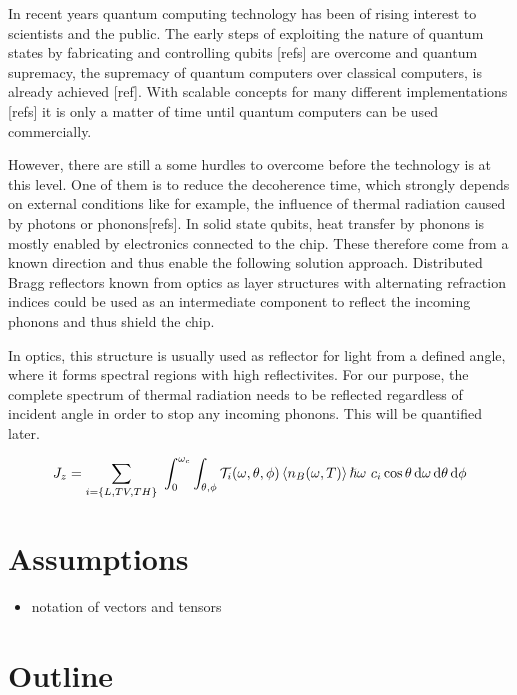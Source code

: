 In recent years quantum computing technology has been of rising
interest to scientists and the public. The early steps of exploiting the nature
of quantum states by fabricating and controlling qubits [refs] are
overcome and quantum supremacy, the supremacy of quantum computers over
classical computers, is already achieved [ref]. With scalable concepts for many
different implementations [refs] it is only a matter of time until quantum
computers can be used commercially.

However, there are still a some hurdles to overcome before the technology is at
this level. One of them is to reduce the decoherence time, which strongly
depends on external conditions like for example, the influence of thermal
radiation caused by photons or phonons[refs]. In solid state qubits, heat
transfer by
phonons is mostly enabled by electronics connected to the chip. These therefore
come from a known direction and thus enable the following solution approach.
Distributed Bragg reflectors known from optics as layer structures with
alternating refraction indices could be used as an intermediate component to
reflect the incoming phonons and thus shield the chip.

In optics, this structure is usually used as reflector for light from a
defined angle, where it forms spectral regions with high reflectivites. For our
purpose, the complete spectrum of thermal radiation needs to be reflected
regardless of incident angle in order to stop any incoming phonons. This will
be quantified later.

\begin{equation} \label{eq:totalheatflow}
    J_z = \sum\limits_{i=\{L,TV,TH\}}\ \int_0^{\omega_c}\int_{\theta, \phi}
    \mathcal{T}_i(\omega, \theta, \phi) \expval{n_B(\omega, T)} \hslash \omega\ 
    c_i\cos \theta \dd{\omega} \dd{\theta}\dd{\phi}
\end{equation}

\section{Assumptions}
\begin{itemize}
    \item notation of vectors and tensors
\end{itemize}

\section{Outline}